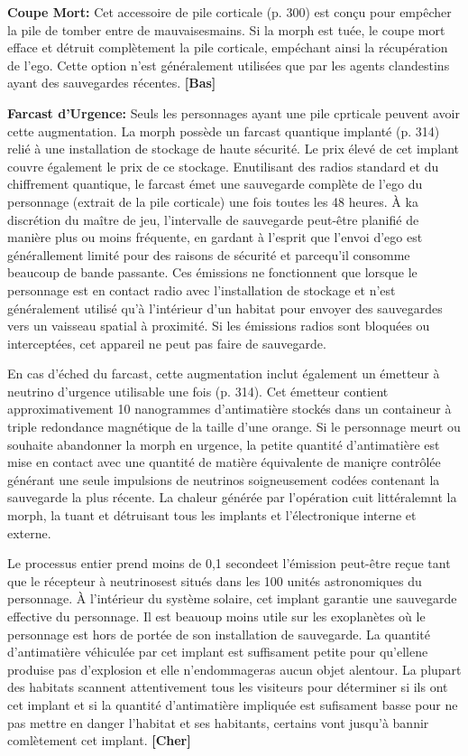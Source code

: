 \textbf{Coupe Mort:} Cet accessoire de pile corticale (p. 300) est conçu pour empêcher la pile de tomber entre de mauvaisesmains. Si la morph est tuée, le coupe mort efface et détruit complètement la pile corticale, empéchant ainsi la récupération de l'ego. Cette option n'est généralement utilisées que par les agents clandestins ayant des sauvegardes récentes. \textbf{[Bas]} 

\textbf{Farcast d'Urgence:} Seuls les personnages ayant une pile cprticale peuvent avoir cette augmentation. La morph possède un farcast quantique implanté (p. 314) relié à une installation de stockage de haute sécurité. Le prix élevé de cet  implant couvre également le prix de ce stockage. Enutilisant des radios standard et du chiffrement quantique, le farcast émet une sauvegarde complète de l'ego du personnage (extrait de la pile corticale) une fois toutes les 48 heures. À ka discrétion du maître de jeu, l'intervalle de sauvegarde peut-être planifié de manière plus ou moins fréquente, en gardant à l'esprit que l'envoi d'ego est générallement limité pour des raisons de sécurité et parcequ'il consomme beaucoup de bande passante. Ces émissions ne fonctionnent que lorsque le personnage est en contact radio avec l'installation de stockage et n'est généralement utilisé qu'à l'intérieur d'un habitat pour envoyer des sauvegardes vers un vaisseau spatial à proximité. Si les émissions radios sont bloquées ou interceptées, cet appareil ne peut pas faire de sauvegarde. 

En cas d'éched du farcast, cette augmentation inclut également un émetteur à neutrino d'urgence utilisable une fois (p. 314). Cet émetteur contient approximativement 10 nanogrammes d'antimatière stockés dans un containeur à triple redondance magnétique de la taille d'une orange. Si le personnage meurt ou souhaite abandonner la morph en urgence, la petite quantité d'antimatière est mise en contact avec une quantité de matière équivalente de maniçre contrôlée générant une seule impulsions de neutrinos soigneusement codées contenant la sauvegarde la plus récente. La chaleur générée par l'opération cuit littéralemnt la morph, la tuant et détruisant tous les implants et l'électronique interne et externe. 

Le processus entier prend moins de 0,1 secondeet l'émission peut-être reçue tant que le récepteur à neutrinosest situés dans les 100 unités astronomiques du personnage. À l'intérieur du système solaire, cet implant garantie une sauvegarde effective du personnage. Il est beauoup moins utile sur les exoplanètes où le personnage est hors de portée de son installation de sauvegarde. La quantité d'antimatière véhiculée par cet implant est suffisament petite pour qu'ellene produise pas d'explosion et elle n'endommageras aucun objet alentour. La plupart des habitats scannent attentivement  tous les visiteurs pour déterminer si ils ont cet implant et si la quantité d'antimatière impliquée est sufisament basse pour ne pas mettre en danger l'habitat et ses habitants, certains vont jusqu'à bannir comlètement cet implant. \textbf{[Cher]} 


